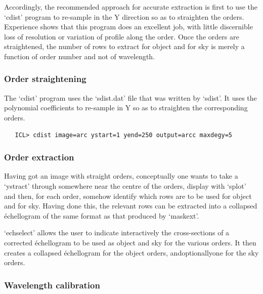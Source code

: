   Accordingly, the recommended approach for accurate extraction is
   first to use the `cdist' program to re-sample in the Y direction so
   as to straighten the orders. Experience shows that this program
   does an excellent job, with little discernible loss of resolution or
   variation of profile along the order. Once the orders are
   straightened, the number of rows to extract for object and for sky is
   merely a function of order number and not of wavelength.


\subsubsection{Order straightening}

   The `cdist' program uses the `sdist.dat' file that was written by
   `sdist'. It uses the polynomial coefficients to re-sample in Y so as
   to straighten the corresponding orders.

\begin{verbatim}
   ICL> cdist image=arc ystart=1 yend=250 output=arcc maxdegy=5
\end{verbatim}


\subsubsection{Order extraction}

   Having got an image with straight orders, conceptually one wants to
   take a `ystract' through somewhere near the centre of the orders,
   display with `splot' and then, for each order, somehow identify which
   rows are to be used for object and for sky. Having done this, the
   relevant rows can be extracted into a collapsed \'echellogram of the
   same format as that produced by `maskext'.

   `echselect' allows the user to indicate interactively the
   cross-sections of a corrected \'echellogram to be used as object and
   sky for the various orders. It then creates a collapsed \'echellogram
   for the object orders, and\latorhtm{---}{-}optionally\latorhtm{---}{-}one
   for the sky orders.


\subsubsection{\label{techno13calib}Wavelength calibration}

